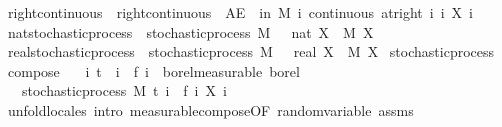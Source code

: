\begin{isabellebody}
\isamarkupfalse%
\ right{\isacharunderscore}{\kern0pt}continuous\ \ {\isachardoublequoteopen}right{\isacharunderscore}{\kern0pt}continuous\ {\isacharequal}{\kern0pt}\ {\isacharparenleft}{\kern0pt}AE\ {\isasymxi}\ in\ M{\isachardot}{\kern0pt}\ {\isasymforall}i{\isachardot}{\kern0pt}\ continuous\ {\isacharparenleft}{\kern0pt}at{\isacharunderscore}{\kern0pt}right\ i{\isacharparenright}{\kern0pt}\ {\isacharparenleft}{\kern0pt}{\isasymlambda}i{\isachardot}{\kern0pt}\ X\ i\ {\isasymxi}{\isacharparenright}{\kern0pt}{\isacharparenright}{\kern0pt}{\isachardoublequoteclose}\isanewline
\isanewline
{}\isamarkupfalse%
\isanewline
\isanewline
{}\isamarkupfalse%
\ nat{\isacharunderscore}{\kern0pt}stochastic{\isacharunderscore}{\kern0pt}process\ {\isacharequal}{\kern0pt}\ stochastic{\isacharunderscore}{\kern0pt}process\ M\ {\isachardoublequoteopen}{}\ {\isacharcolon}{\kern0pt}{\isacharcolon}{\kern0pt}\ nat{\isachardoublequoteclose}\ X\ \ M\ X\isanewline
{}\isamarkupfalse%
\ real{\isacharunderscore}{\kern0pt}stochastic{\isacharunderscore}{\kern0pt}process\ {\isacharequal}{\kern0pt}\ stochastic{\isacharunderscore}{\kern0pt}process\ M\ {\isachardoublequoteopen}{}\ {\isacharcolon}{\kern0pt}{\isacharcolon}{\kern0pt}\ real{\isachardoublequoteclose}\ X\ \ M\ X\isanewline
\isanewline
{}\isamarkupfalse%
\ stochastic{\isacharunderscore}{\kern0pt}process\isanewline
{}\isanewline
\isanewline
{}\isamarkupfalse%
\ compose{\isacharcolon}{\kern0pt}\isanewline
\ \ \ {\isachardoublequoteopen}{\isasymAnd}i{\isachardot}{\kern0pt}\ t\ {\isasymle}\ i\ {\isasymLongrightarrow}\ f\ i\ {\isasymin}\ borel{\isacharunderscore}{\kern0pt}measurable\ borel{\isachardoublequoteclose}\isanewline
\ \ \ {\isachardoublequoteopen}stochastic{\isacharunderscore}{\kern0pt}process\ M\ t\ {\isacharparenleft}{\kern0pt}{\isasymlambda}i\ {\isasymxi}{\isachardot}{\kern0pt}\ {\isacharparenleft}{\kern0pt}f\ i{\isacharparenright}{\kern0pt}\ {\isacharparenleft}{\kern0pt}X\ i\ {\isasymxi}{\isacharparenright}{\kern0pt}{\isacharparenright}{\kern0pt}{\isachardoublequoteclose}\isanewline
%
\isadelimproof
\ \ %
\endisadelimproof
%
\isatagproof
{}\isamarkupfalse%
\ {\isacharparenleft}{\kern0pt}unfold{\isacharunderscore}{\kern0pt}locales{\isacharparenright}{\kern0pt}\ {\isacharparenleft}{\kern0pt}intro\ measurable{\isacharunderscore}{\kern0pt}compose{\isacharbrackleft}{\kern0pt}OF\ random{\isacharunderscore}{\kern0pt}variable\ assms{\isacharbrackright}{\kern0pt}{\isacharparenright}{\kern0pt}%

\end{isabellebody}
